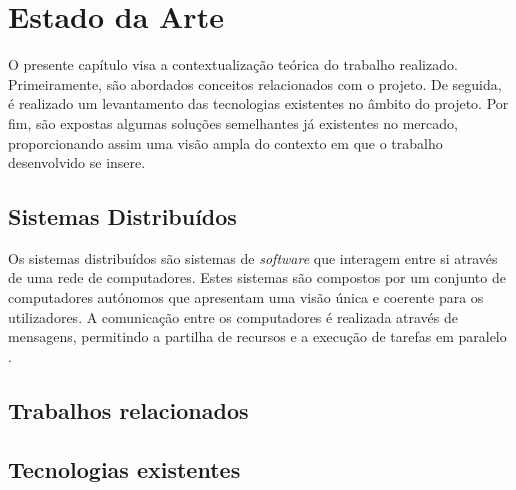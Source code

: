 \chapter{Estado da Arte}
\label{sec:2-EstadoArte}

O presente capítulo visa a contextualização teórica do trabalho realizado. Primeiramente, são 
abordados conceitos relacionados com o projeto. De seguida, é realizado um levantamento 
das tecnologias existentes no âmbito do projeto. Por fim, são expostas algumas soluções semelhantes 
já existentes no mercado, proporcionando assim uma visão ampla do contexto em que o trabalho 
desenvolvido se insere.


\section{Sistemas Distribuídos}

Os sistemas distribuídos são sistemas de \textit{software} que interagem entre si através de uma rede
de computadores. Estes sistemas são compostos por um conjunto de computadores autónomos que
apresentam uma visão única e coerente para os utilizadores. A comunicação entre os computadores
é realizada através de mensagens, permitindo a partilha de recursos e a execução de tarefas em
paralelo \cite{verissimo2001distributed}.



\section{Trabalhos relacionados}



\section{Tecnologias existentes}

